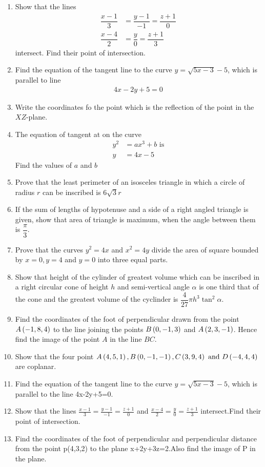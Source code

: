 \begin{enumerate}
    \item Show that the lines
          \begin{align*}
              \dfrac{x-1}{3} & = \dfrac{y-1}{-1} = \dfrac{z+1}{0} \\
              \dfrac{x-4}{2} & = \dfrac{y}{0} = \dfrac{z+1}{3}
          \end{align*}
          intersect. Find their point of intersection.
    \item Find the equation of the tangent line to the curve $y=\sqrt{5x-3} -5$, which is parallel to line
          \begin{align*}
              4x-2y+5=0
          \end{align*}
    \item Write the coordinates fo the point which is the reflection of the point \brak{\alpha,\beta,\gamma} in the $XZ$-plane.
    \item The equation of tangent at  on the curve
          \begin{align*}
              y^2 & = ax^3 + b \text { is} \\
              y   & = 4x -5
          \end{align*}
          Find the values of $a$ and $b$
    \item Prove that the least perimeter of an isosceles triangle in which a circle of radius $r$ can be inscribed is $6 \sqrt{3} r$
    \item If the sum of lengths of hypotenuse and a side of a right angled triangle is given, show that area of triangle is maximum, when the angle between them is $\dfrac{\pi}{3}$.
    \item Prove that the curves $y^2=4x$ and $x^2= 4y$ divide the area of square bounded by $x=0,y=4$ and $y=0$ into three equal parts.
    \item Show that height of the cylinder of greatest volume which can be inscribed in a right circular cone of height $h$ and semi-vertical angle $\alpha$ is one third that of the cone and the greatest volume of the cyclinder is $\dfrac{4}{27}\pi h^3\tan^2\alpha$.
    \item Find the coordinates of the foot of perpendicular drawn from the point $A\left(-1,8,4\right)$ to the line joining the points $B\left(0,-1,3\right)$ and $A\left(2,3,-1\right)$. Hence find the image of the point $A$ in the line $BC$.

    \item Show that the four point $A\left(4, 5, 1\right), B\left(0,-1,-1\right), C\left(3,9,4\right) \text{ and } D\left(-4,4,4\right)$ are coplanar.
    \item Find the equation of the tangent line to the curve $y = \sqrt{5x-3} -5$, which is parallel to the line
              {4x-2y+5=0.}
    \item Show that the lines $\frac{x-1}{3} = \frac{y-1}{-1} = \frac{z+1}{0} $ and $\frac{x-4}{2} = \frac{y}{0} = \frac{z+1}{3} $ intersect.Find their point of intersection.
    \item Find the coordinates of the foot of perpendicular and perpendicular distance from the point p(4,3,2) to the plane x+2y+3z=2.Also find the image of P in the plane.

\end{enumerate}
